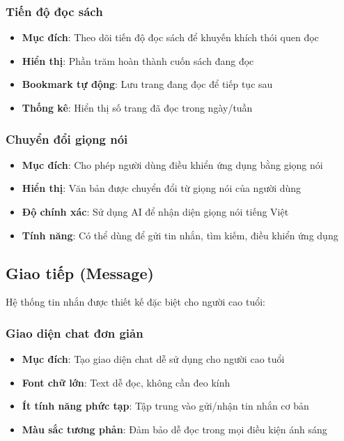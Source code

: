 \documentclass[12pt,a4paper]{article}
\begin{document}
\subsubsection{Tiến độ đọc sách}
\begin{itemize}[leftmargin=2cm]
    \item \textbf{Mục đích}: Theo dõi tiến độ đọc sách để khuyến khích thói quen đọc
    \item \textbf{Hiển thị}: Phần trăm hoàn thành cuốn sách đang đọc
    \item \textbf{Bookmark tự động}: Lưu trang đang đọc để tiếp tục sau
    \item \textbf{Thống kê}: Hiển thị số trang đã đọc trong ngày/tuần
\end{itemize}

\subsubsection{Chuyển đổi giọng nói}
\begin{itemize}[leftmargin=2cm]
    \item \textbf{Mục đích}: Cho phép người dùng điều khiển ứng dụng bằng giọng nói
    \item \textbf{Hiển thị}: Văn bản được chuyển đổi từ giọng nói của người dùng
    \item \textbf{Độ chính xác}: Sử dụng AI để nhận diện giọng nói tiếng Việt
    \item \textbf{Tính năng}: Có thể dùng để gửi tin nhắn, tìm kiếm, điều khiển ứng dụng
\end{itemize}

\subsection{Giao tiếp (Message)}
Hệ thống tin nhắn được thiết kế đặc biệt cho người cao tuổi:

\subsubsection{Giao diện chat đơn giản}
\begin{itemize}[leftmargin=2cm]
    \item \textbf{Mục đích}: Tạo giao diện chat dễ sử dụng cho người cao tuổi
    \item \textbf{Font chữ lớn}: Text dễ đọc, không cần đeo kính
    \item \textbf{Ít tính năng phức tạp}: Tập trung vào gửi/nhận tin nhắn cơ bản
    \item \textbf{Màu sắc tương phản}: Đảm bảo dễ đọc trong mọi điều kiện ánh sáng
\end{itemize}
\end{document}

